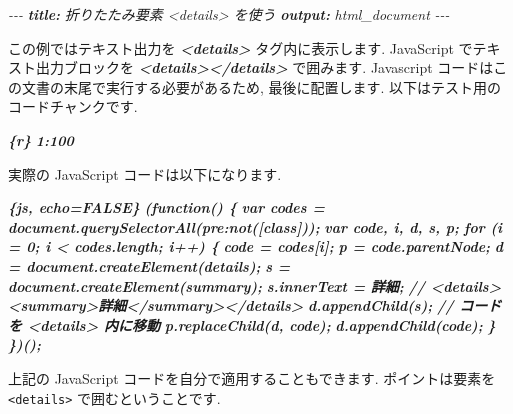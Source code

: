 \documentclass[
  11pt,
]{bxjsreport}
\newenvironment{Shaded}{\begin{snugshade}}{\end{snugshade}}
\newcommand{\AnnotationTok}[1]{\textcolor[rgb]{0.56,0.35,0.01}{\textbf{\textit{#1}}}}
\newcommand{\CommentTok}[1]{\textcolor[rgb]{0.56,0.35,0.01}{\textit{#1}}}
\newcommand{\InformationTok}[1]{\textcolor[rgb]{0.56,0.35,0.01}{\textbf{\textit{#1}}}}
\newcommand{\NormalTok}[1]{#1}
\begin{document}
\begin{Shaded}
\begin{Highlighting}[]
\CommentTok{{-}{-}{-}}
\AnnotationTok{title:}\CommentTok{ 折りたたみ要素 \textasciigrave{}\textless{}details\textgreater{}\textasciigrave{} を使う}
\AnnotationTok{output:}\CommentTok{ html\_document}
\CommentTok{{-}{-}{-}}

\NormalTok{この例ではテキスト出力を }\InformationTok{\textasciigrave{}\textless{}details\textgreater{}\textasciigrave{}}\NormalTok{ タグ内に表示します.}
\NormalTok{JavaScript でテキスト出力ブロックを }\InformationTok{\textasciigrave{}\textless{}details\textgreater{}\textless{}/details\textgreater{}\textasciigrave{}}\NormalTok{ で囲みます.}
\NormalTok{Javascript コードはこの文書の末尾で実行する必要があるため,}
\NormalTok{最後に配置します. 以下はテスト用のコードチャンクです.}

\InformationTok{\textasciigrave{}\textasciigrave{}\textasciigrave{}\{r\}}
\InformationTok{1:100}
\InformationTok{\textasciigrave{}\textasciigrave{}\textasciigrave{}}

\NormalTok{実際の JavaScript コードは以下になります.}

\InformationTok{\textasciigrave{}\textasciigrave{}\textasciigrave{}\{js, echo=FALSE\}}
\InformationTok{(function() \{}
\InformationTok{  var codes = document.querySelectorAll(\textquotesingle{}pre:not([class])\textquotesingle{});}
\InformationTok{  var code, i, d, s, p;}
\InformationTok{  for (i = 0; i \textless{} codes.length; i++) \{}
\InformationTok{    code = codes[i];}
\InformationTok{    p = code.parentNode;}
\InformationTok{    d = document.createElement(\textquotesingle{}details\textquotesingle{});}
\InformationTok{    s = document.createElement(\textquotesingle{}summary\textquotesingle{});}
\InformationTok{    s.innerText = \textquotesingle{}詳細\textquotesingle{};}
\InformationTok{    // \textless{}details\textgreater{}\textless{}summary\textgreater{}詳細\textless{}/summary\textgreater{}\textless{}/details\textgreater{}}
\InformationTok{    d.appendChild(s);}
\InformationTok{    // コードを \textless{}details\textgreater{} 内に移動}
\InformationTok{    p.replaceChild(d, code);}
\InformationTok{    d.appendChild(code);}
\InformationTok{  \}}
\InformationTok{\})();}
\InformationTok{\textasciigrave{}\textasciigrave{}\textasciigrave{}}
\end{Highlighting}
\end{Shaded}

上記の JavaScript コードを自分で適用することもできます. ポイントは要素を \texttt{\textless{}details\textgreater{}} で囲むということです.
\end{document}
